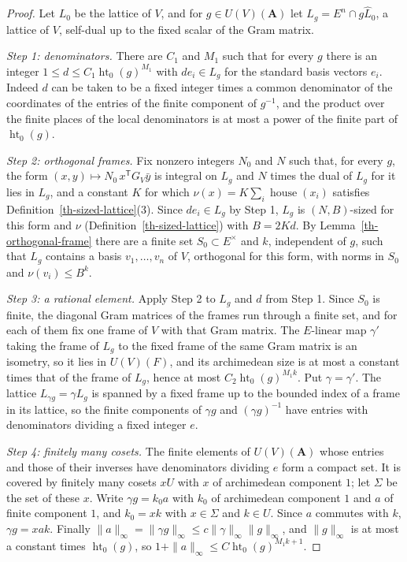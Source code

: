 \begin{proof}
Let $L_0$ be the lattice of $V$, and for $g\in U(V)(\mathbf A)$ let
$L_g=E^n\cap g\widehat L_0$, a lattice of $V$, self-dual up to the fixed
scalar of the Gram matrix.

\emph{Step 1: denominators.} There are $C_1$ and $M_1$ such that for every $g$
there is an integer $1\leq d\leq C_1\operatorname{ht}_0(g)^{M_1}$ with
$de_i\in L_g$ for the standard basis vectors $e_i$. Indeed $d$ can be taken to
be a fixed integer times a common denominator of the coordinates of the
entries of the finite component of $g^{-1}$, and the product over the finite
places of the local denominators is at most a power of the finite part of
$\operatorname{ht}_0(g)$.

\emph{Step 2: orthogonal frames.} Fix nonzero integers $N_0$ and $N$ such that,
for every $g$, the form $(x,y)\mapsto N_0\,x^{\mathsf T}G_V\bar y$ is integral on
$L_g$ and $N$ times the dual of $L_g$ for it lies in $L_g$, and a constant $K$
for which $\nu(x)=K\sum_i\operatorname{house}(x_i)$ satisfies
Definition~\ref{th-sized-lattice}(3). Since $de_i\in L_g$ by Step 1, $L_g$ is
$(N,B)$-sized for this form and $\nu$ (Definition~\ref{th-sized-lattice}) with
$B=2Kd$. By
Lemma~\ref{th-orthogonal-frame} there are a finite set $S_0\subset E^\times$ and
$k$, independent of $g$, such that $L_g$ contains a basis $v_1,\ldots,v_n$ of
$V$, orthogonal for this form, with norms in $S_0$ and $\nu(v_i)\leq B^k$.

\emph{Step 3: a rational element.} Apply Step 2 to $L_g$ and $d$ from Step 1.
Since $S_0$ is finite, the diagonal Gram matrices of the frames run through a
finite set, and for each of them fix one frame of $V$ with that Gram matrix.
The $E$-linear map $\gamma'$ taking the frame of $L_g$ to the fixed frame of
the same Gram matrix is an isometry, so it lies in $U(V)(F)$, and its
archimedean size is at most a constant times that of the frame of $L_g$,
hence at most $C_2\operatorname{ht}_0(g)^{M_1k}$. Put $\gamma=\gamma'$. The
lattice $L_{\gamma g}=\gamma L_g$ is spanned by a fixed frame up to
the bounded index of a frame in its lattice, so the finite components of
$\gamma g$ and $(\gamma g)^{-1}$ have entries with denominators dividing a fixed
integer $e$.

\emph{Step 4: finitely many cosets.} The finite elements of $U(V)(\mathbf A)$
whose entries and those of their inverses have denominators dividing $e$ form a
compact set. It is covered by finitely many cosets $xU$ with $x$ of archimedean
component $1$; let $\Sigma$ be the set of these $x$. Write $\gamma g=k_0a$ with
$k_0$ of archimedean component $1$ and $a$ of finite component $1$, and
$k_0=xk$ with $x\in\Sigma$ and $k\in U$. Since $a$ commutes with $k$,
$\gamma g=xak$. Finally $\|a\|_\infty=\|\gamma g\|_\infty\leq
c\|\gamma\|_\infty\|g\|_\infty$, and $\|g\|_\infty$ is at most a constant times
$\operatorname{ht}_0(g)$, so $1+\|a\|_\infty\leq C\operatorname{ht}_0(g)^{M_1k+1}$.
\end{proof}

